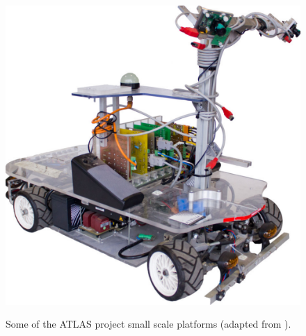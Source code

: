 \begin{figure}[!h]
\begin{minipage}[t]{0.32\textwidth}
			\label{fig:modelosatlas2}
		\end{minipage}
		\begin{minipage}[t]{0.32\textwidth}
			\includegraphics[width=\textwidth]{./figure/modelosatlas3.pdf}
			\label{fig:modelosatlas3}
		\end{minipage}
		\caption{Some of the ATLAS project small scale platforms (adapted from \cite{Pereira2012}).}
		\label{fig:modelosatlas}
\end{figure}

